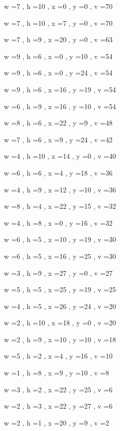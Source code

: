 \documentclass[11pt]{article}
\begin{document}
w =7 , h =10 , x =0 , y =0 , v =70
\par
w =7 , h =10 , x =7 , y =0 , v =70
\par
w =7 , h =9 , x =20 , y =0 , v =63
\par
w =9 , h =6 , x =0 , y =10 , v =54
\par
w =9 , h =6 , x =0 , y =24 , v =54
\par
w =9 , h =6 , x =16 , y =19 , v =54
\par
w =6 , h =9 , x =16 , y =10 , v =54
\par
w =8 , h =6 , x =22 , y =9 , v =48
\par
w =7 , h =6 , x =9 , y =24 , v =42
\par
w =4 , h =10 , x =14 , y =0 , v =40
\par
w =6 , h =6 , x =4 , y =18 , v =36
\par
w =4 , h =9 , x =12 , y =10 , v =36
\par
w =8 , h =4 , x =22 , y =15 , v =32
\par
w =4 , h =8 , x =0 , y =16 , v =32
\par
w =6 , h =5 , x =10 , y =19 , v =30
\par
w =6 , h =5 , x =16 , y =25 , v =30
\par
w =3 , h =9 , x =27 , y =0 , v =27
\par
w =5 , h =5 , x =25 , y =19 , v =25
\par
w =4 , h =5 , x =26 , y =24 , v =20
\par
w =2 , h =10 , x =18 , y =0 , v =20
\par
w =2 , h =9 , x =10 , y =10 , v =18
\par
w =5 , h =2 , x =4 , y =16 , v =10
\par
w =1 , h =8 , x =9 , y =10 , v =8
\par
w =3 , h =2 , x =22 , y =25 , v =6
\par
w =2 , h =3 , x =22 , y =27 , v =6
\par
w =2 , h =1 , x =20 , y =9 , v =2
\par
\newpage


\end{document}
